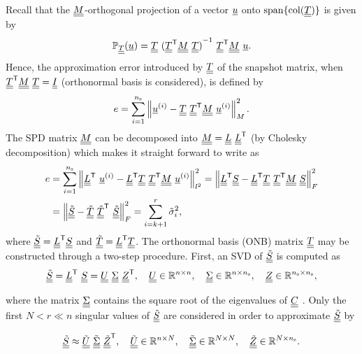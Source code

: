 Recall that the $\underline{\underline{M}}$-orthogonal projection of a vector $\underline{u}$ onto $ {\rm span} \{ {\rm col}(\underline{\underline{T}}) \}$ is given by \parencite{antoulas2005approximation}
\begin{equation}
	\ffP_{\mT} (\vek{u}) = \mat{T} \ \inv{(\T{\mat{T}} \mat M \ {\mat{T}} )} \ \T{\mat{T}} \mat M \ \vek{u}.
\end{equation}
Hence, the approximation error introduced by $\underline{\underline{T}}$ of the snapshot matrix, when ${\underline{\underline{T}}}^{\sf T} \underline{\underline{M}} \ {\underline{\underline{T}}} =\underline{\underline{I}}$ (orthonormal basis is considered), is defined by
\begin{equation}
	e=\sum_{i=1}^{\ns}\normM{ \vek{u}\bi - \mat{T} \ \T{\mat{T}} \mat M \ \vek{u}\bi}{M}{2}.
	\label{eq:svderr}
\end{equation}
The SPD matrix $\underline{\underline{M}}$ can be decomposed into $\underline{\underline{M}} = \underline{\underline{L}} \ {\underline{\underline{L}}}^{\sf T}$ (by Cholesky decomposition) which makes it straight forward to write  as
\begin{equation}
	\begin{split}
		e&=\sum_{i=1}^{\ns}\normM{ \T{\mat{L}} \ \vek{u}\bi - \T{\mat{L}} \mat{T} \ \T{\mat{T}} \mat M \ \vek{u}\bi}{l^2}{2} =
		\normM{ \T{\mat{L}} \mat{S} - \T{\mat{L}} \mat{T} \ \T{\mat{T}} \mat M \ \mat{S}}{F}{2}\\
		&= \normM{ \mat{\z S} - \mat{\z T} \ \T{\mat{\z T}} \ \mat{\z S}}{F}{2} =\sum_{i=k+1}^{r} \z{\sigma}_i^2,
	\end{split}
	\label{eq:svd_err}
\end{equation}
where ${\underline{\underline{{\tilde{S}}}}}={\underline{\underline{L}}}^{\sf T} \underline{\underline{S}}$ and ${\underline{\underline{{\tilde{T}}}}}={\underline{\underline{L}}}^{\sf T} \underline{\underline{T}}$. The orthonormal basis (ONB) matrix $\underline{\underline{T}}$ may be constructed through a two-step procedure. First, an SVD of ${\underline{\underline{{\tilde{S}}}}}$ is computed as
\begin{equation}
	{\mat{\z S}}=\T{\mat L} \ \mat S = \mat{U} \ \mat{\Sigma} \ \T{\mat{Z}}, \quad
	\mat{U} \in \ffR^{n \times n}, \quad
	\mat{\Sigma}\in \ffR^{n \times \ns }, \quad
	\mat{Z}\in \ffR^{\ns \times \ns },
\end{equation}

where the matrix $\underline{\underline{\Sigma}}$ contains the square root of the eigenvalues of ${\underline{\underline{C}}}$ \parencite{quarteroni2015reduced}. Only the first $N < r \ll n$ singular values of $\underline{\underline{{\tilde{S}}}}$ are considered in order to approximate $\underline{\underline{{\tilde{S}}}}$ by

\begin{equation}
	\underline{\underline{{\tilde{S}}}} \approx \underline{\underline{{\tilde{U}}}} \ \underline{\underline{{\tilde{\Sigma}}}} \ {\underline{\underline{{\tilde{Z}}}}}^{\sf T}, \quad
	\underline{\underline{{\tilde{U}}}} \in {\mathbb{ R}}^{n \times N}, \quad
	\underline{\underline{{\tilde{\Sigma}}}}\in {\mathbb{ R}}^{N \times N }, \quad
	\underline{\underline{{\tilde{Z}}}}\in {\mathbb{ R}}^{N \times {n_{\rm s}} }.
\end{equation}

